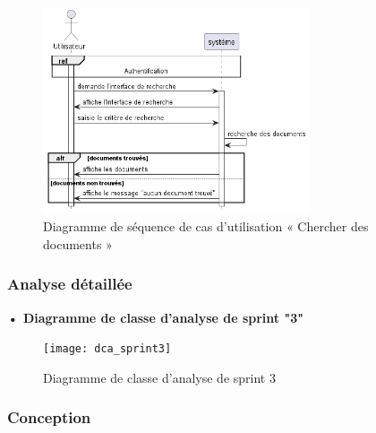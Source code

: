 \begin{figure}[H]
  \centering
  \includegraphics[width=0.7\textwidth]{out/diagrams/documents/chercher/charcher_document}
  \caption{Diagramme de séquence de cas d'utilisation « Chercher des documents  »}
  \label{fig:sequence_charcher_document}
\end{figure}

\subsubsection{Analyse détaillée}
\textbf{•	Diagramme de classe d'analyse de sprint "3" }
\newpage

\begin{figure}
  \centering
  \texttt{[image: dca\_sprint3]}
  \caption{Diagramme de classe d'analyse de sprint 3}
  \label{fig:class_analyse_signatures3}
\end{figure}


\subsubsection{Conception}


